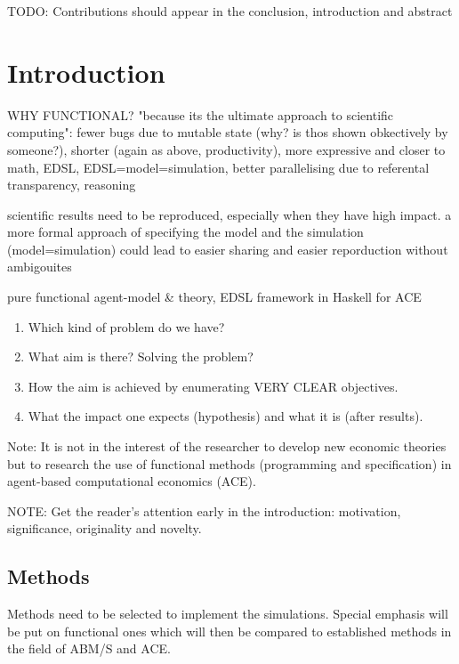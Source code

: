 \documentclass{article}
\begin{document}

TODO: Contributions should appear in the conclusion, introduction and abstract


\section{Introduction}
WHY FUNCTIONAL? "because its the ultimate approach to scientific computing": fewer bugs due to mutable state (why? is thos shown obkectively by someone?), shorter (again as above, productivity), more expressive and closer to math, EDSL, EDSL=model=simulation, better parallelising due to referental transparency, reasoning

scientific results need to be reproduced, especially when they have high impact. a more formal approach of specifying the model and the simulation (model=simulation) could lead to easier sharing and easier reporduction without ambigouites

pure functional agent-model \& theory, EDSL framework in Haskell for ACE

\begin{enumerate}
\item Which kind of problem do we have?
\item What aim is there? Solving the problem? 
\item How the aim is achieved by enumerating VERY CLEAR objectives.
\item What the impact one expects (hypothesis) and what it is (after results).
\end{enumerate}

Note: It is not in the interest of the researcher to develop new economic theories but to research the use of functional methods (programming and specification) in agent-based computational economics (ACE).

NOTE: Get the reader’s attention early in the introduction: motivation, significance, originality and novelty.

\subsection{Methods}
Methods need to be selected to implement the simulations. Special emphasis will be put on functional ones which will then be compared to established methods in the field of ABM/S and ACE. 
\end{document}
